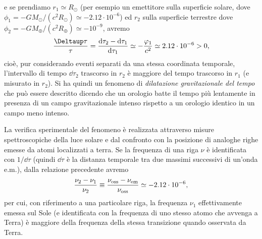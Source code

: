 e se prendiamo $r_1 \simeq R_\odot$ (per esempio un emettitore sulla superficie
solare, dove $\phi_1 = - GM_{\odot}/(c^2 R_{\odot}) \simeq -2.12 \cdot 10^{-6}$)
ed $r_2$ sulla superficie terrestre dove $\phi_2 = -GM_{\oplus}/(c^2 R_{\oplus})
\simeq - 10^{-9}$, avremo
\begin{equation}
  \frac{\var\tau}{\tau} = \frac{\dd\tau_{2} - \dd\tau_{1}}{\dd\tau_{1}} \simeq 
  - \frac{\phi_{1}}{c^{2}} \simeq 2.12 \cdot 10^{-6} > 0,
\end{equation}
cioè, pur considerando eventi separati da una stessa coordinata temporale,
l'intervallo di tempo $\dd\tau_2$ trascorso in $r_{2}$ è maggiore del tempo
trascorso in $r_{1}$ (e misurato in $r_2$).  Si ha quindi un fenomeno di
 \emph{dilatazione
  gravitazionale del tempo} che può essere descritto dicendo che un orologio
batte il tempo più lentamente in presenza di un campo gravitazionale intenso
rispetto a un orologio identico in un campo meno intenso.

La verifica sperimentale del fenomeno è realizzata attraverso misure
spettroscopiche della luce solare e dal confronto con la posizione di analoghe
righe emesse da atomi localizzati a terra.  Se la frequenza di una riga $\nu$ è
identificata con $1/\dd\tau$ (quindi $\dd\tau$ è la distanza temporale tra due
massimi successivi di un'onda e.m.), dalla relazione precedente avremo
\begin{equation}
  \frac{\nu_2 - \nu_1} {\nu_2}  \equiv \frac{\nu_{\textup{oss}} -
    \nu_{\textup{em}}}{\nu_{\textup{oss}}} \simeq - 2.12 \cdot 10^{-6},
\end{equation}
per cui, con riferimento a una particolare riga, la frequenza $\nu_1$
effettivamente emessa sul Sole (e identificata con la frequenza di uno stesso
atomo che avvenga a Terra) è maggiore della frequenza della stessa transizione
quando osservata da Terra.

